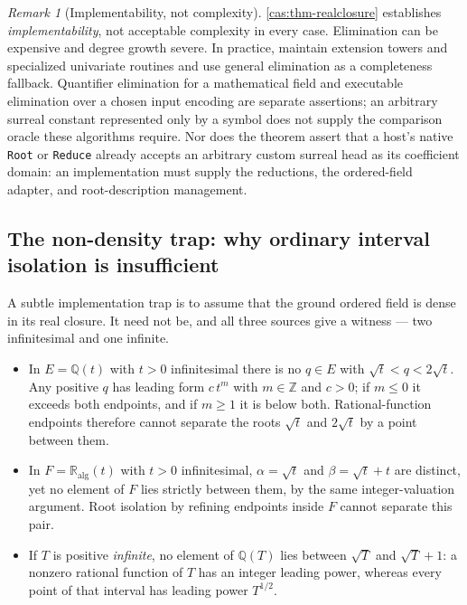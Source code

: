 \documentclass[11pt,letterpaper]{article}
\numberwithin{equation}{section}
\theoremstyle{definition}
\theoremstyle{remark}
\newtheorem{remark}[theorem]{Remark}
\newcommand{\Q}{\mathbb Q}
\newcommand{\Z}{\mathbb Z}
\newcommand{\RA}{\mathbb R_{\mathrm{alg}}}
\begin{document}
\begin{remark}[Implementability, not complexity]\label{cas:rem-complexity}
\cref{cas:thm-realclosure} establishes \emph{implementability}, not acceptable
complexity in every case. Elimination can be expensive and degree growth severe.
In practice, maintain extension towers and specialized univariate routines and
use general elimination as a completeness fallback. Quantifier elimination for a
mathematical field and executable elimination over a chosen input encoding are
separate assertions; an arbitrary surreal constant represented only by a symbol
does not supply the comparison oracle these algorithms require. Nor does the
theorem assert that a host's native \texttt{Root} or \texttt{Reduce} already
accepts an arbitrary custom surreal head as its coefficient domain: an
implementation must supply the reductions, the ordered-field adapter, and
root-description management.
\end{remark}

\subsection{The non-density trap: why ordinary interval isolation is insufficient}
\label{cas:sub-nondensity}
A subtle implementation trap is to assume that the ground ordered field is dense
in its real closure. It need not be, and all three sources give a witness ---
two infinitesimal and one infinite.

\begin{itemize}
\item In $E=\Q(t)$ with $t>0$ infinitesimal there is no $q\in E$ with
$\sqrt t<q<2\sqrt t$. Any positive $q$ has leading form $c\,t^m$ with $m\in\Z$
and $c>0$; if $m\le0$ it exceeds both endpoints, and if $m\ge1$ it is below
both. Rational-function endpoints therefore cannot separate the roots $\sqrt t$
and $2\sqrt t$ by a point between them.
\item In $F=\RA(t)$ with $t>0$ infinitesimal, $\alpha=\sqrt t$ and
$\beta=\sqrt t+t$ are distinct, yet no element of $F$ lies strictly between
them, by the same integer-valuation argument. Root isolation by refining
endpoints inside $F$ cannot separate this pair.
\item If $T$ is positive \emph{infinite}, no element of $\Q(T)$ lies between
$\sqrt T$ and $\sqrt T+1$: a nonzero rational function of $T$ has an integer
leading power, whereas every point of that interval has leading power $T^{1/2}$.
\end{itemize}
\end{document}
